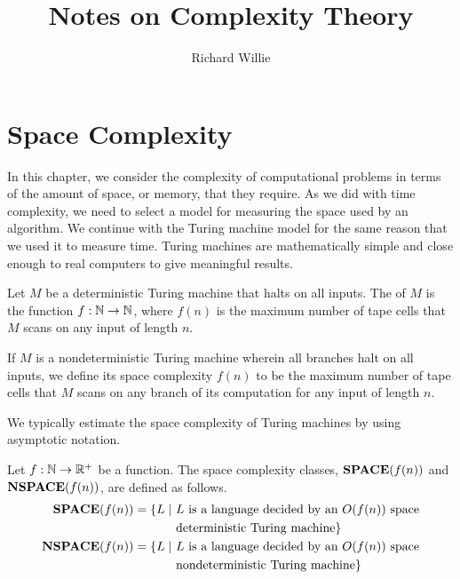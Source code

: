 \documentclass[11pt,twoside=off,numbers=noenddot]{scrbook}
\title{Notes on Complexity Theory}
\author{Richard Willie}
\begin{document}
\maketitle

\tableofcontents

\newpage

\chapter{Space Complexity}

In this chapter, we consider the complexity of computational problems in terms of the amount of space, or memory, that they require. As we did with time complexity, we need to select a model for measuring the space used by an algorithm. We continue with the Turing machine model for the same reason that we used it to measure time. Turing machines are mathematically simple and close enough to real computers to give meaningful results.
\begin{definition}
    Let $M$ be a deterministic Turing machine that halts on all inputs. The  of $M$ is the function $f : \mathbb N \to \mathbb N$, where $f(n)$ is the maximum number of tape cells that $M$ scans on any input of length $n$.

    If $M$ is a nondeterministic Turing machine wherein all branches halt on all inputs, we define its space complexity $f(n)$ to be the maximum number of tape cells that $M$ scans on any branch of its computation for any input of length $n$.
\end{definition}

We typically estimate the space complexity of Turing machines by using asymptotic notation.
\begin{definition}
    Let $f : \mathbb N \to \mathbb R^{+}$ be a function. The space complexity classes, $\textbf{SPACE}(f(n))$ and $\textbf{NSPACE}(f(n))$, are defined as follows.
    \begin{align*}
        \SPACE(f(n)) = \{ L \mid              & \ \text{$L$ is a language decided by an $O(f(n))$ space} \\
                                              & \ \text{deterministic Turing machine} \}                 \\
        \NSPACE(f(n))             = \{ L \mid & \ \text{$L$ is a language decided by an $O(f(n))$ space} \\
                                              & \ \text{nondeterministic Turing machine} \}
    \end{align*}
\end{definition}
\end{document}
